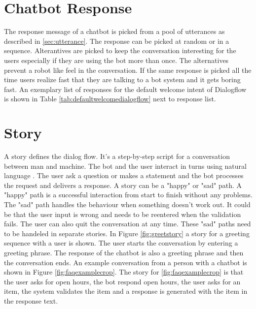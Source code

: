 \section{Chatbot Response} \label{sec:chatbot_response}
The response message of a chatbot is picked from a pool of utterances as described in \ref{sec:utterance}.
The response can be picked at random or in a sequence.
Alterantives are picked to keep the conversation interesting for the users especially
if they are using the bot more than once.
The alternatives prevent a robot like feel in the conversation. 
If the same response is picked all the time users realize fast that they are 
talking to a bot system and it gets boring fast. 
An exemplary list of responses for the default welcome intent of Dialogflow is shown 
in Table \ref{tab:defaultwelcomedialogflow} next to response list.



\section{Story}
A story defines the dialog flow. 
It's a step-by-step script for a conversation between man and machine.
The bot and the user interact in turns using natural language \cite{evaluateChatbotsShawar2007, shawar2007chatbots, huang2007extracting, gregori2017evaluation}.
The user ask a question or makes a statement and the bot processes the request and delivers a response.
A story can be a "happy" or "sad" path.
A "happy" path is a successful interaction from start to finish without any problems.
The "sad" path handles the behaviour when something doesn't work out.
It could be that the user input is wrong and needs to be reentered when the validation fails.
The user can also quit the conversation at any time.
These "sad" paths need to be handeled in separate stories.
In Figure \ref{fig:greetstory} a story for a greeting sequence with a user is shown. 
The user starts the conversation by entering a greeting phrase. 
The response of the chatbot is also a greeting phrase and then the conversation ends. 
An example conversation from a person with a chatbot is shown in Figure \ref{fig:faqexamplecrop}.
The story for \ref{fig:faqexamplecrop} is that the user asks for open hours, the bot respond open hours, 
the user asks for an item, the system validates the item and a response is generated with 
the item in the response text.


